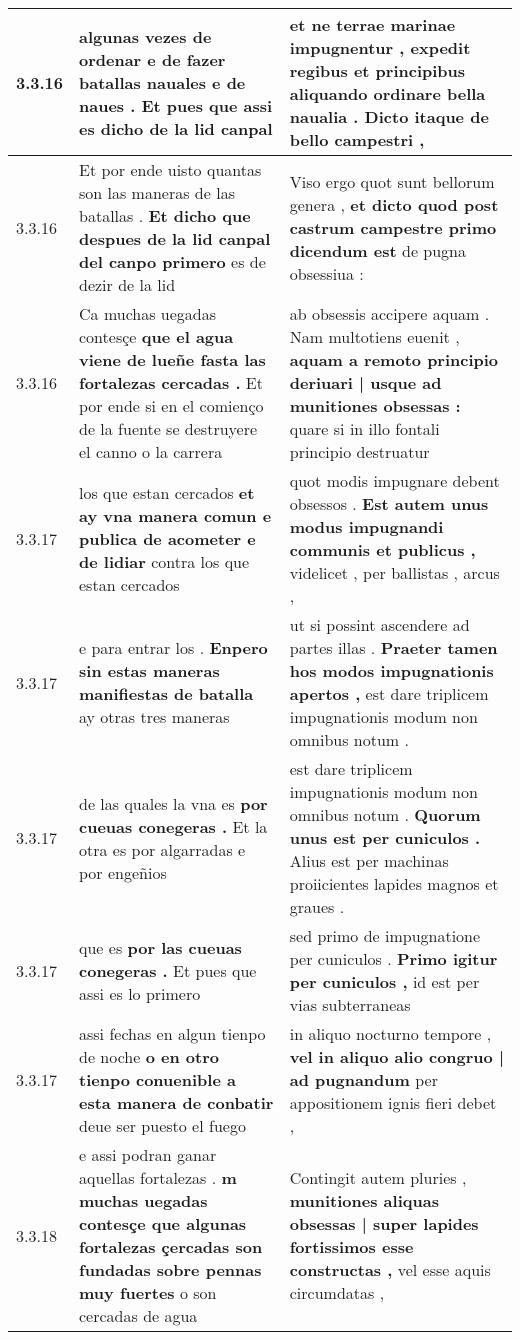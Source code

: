 \begin{tabular}{|p{1cm}|p{6.5cm}|p{6.5cm}|}
3.3.16 & algunas vezes de ordenar \textbf{ e de fazer batallas nauales e de naues . } Et pues que assi es dicho de la lid canpal & et ne terrae marinae impugnentur , \textbf{ expedit regibus et principibus aliquando ordinare bella naualia . } Dicto itaque de bello campestri , \\\hline
3.3.16 & Et por ende uisto quantas son las maneras de las batallas . \textbf{ Et dicho que despues de la lid canpal del canpo primero } es de dezir de la lid & Viso ergo quot sunt bellorum genera , \textbf{ et dicto quod post castrum campestre primo dicendum est } de pugna obsessiua : \\\hline
3.3.16 & Ca muchas uegadas contesçe \textbf{ que el agua viene de lueñe fasta las fortalezas cercadas . } Et por ende si en el comienço de la fuente se destruyere el canno o la carrera & ab obsessis accipere aquam . Nam multotiens euenit , \textbf{ aquam a remoto principio deriuari | usque ad munitiones obsessas : } quare si in illo fontali principio destruatur \\\hline
3.3.17 & los que estan cercados \textbf{ et ay vna manera comun e publica de acometer e de lidiar } contra los que estan cercados & quot modis impugnare debent obsessos . \textbf{ Est autem unus modus impugnandi communis et publicus , } videlicet , per ballistas , arcus , \\\hline
3.3.17 & e para entrar los . \textbf{ Enpero sin estas maneras manifiestas de batalla } ay otras tres maneras & ut si possint ascendere ad partes illas . \textbf{ Praeter tamen hos modos impugnationis apertos , } est dare triplicem impugnationis modum non omnibus notum . \\\hline
3.3.17 & de las quales la vna es \textbf{ por cueuas conegeras . } Et la otra es por algarradas e por engeñios & est dare triplicem impugnationis modum non omnibus notum . \textbf{ Quorum unus est per cuniculos . } Alius est per machinas proiicientes lapides magnos et graues . \\\hline
3.3.17 & que es \textbf{ por las cueuas conegeras . } Et pues que assi es lo primero & sed primo de impugnatione per cuniculos . \textbf{ Primo igitur per cuniculos , } id est per vias subterraneas \\\hline
3.3.17 & assi fechas en algun tienpo de noche \textbf{ o en otro tienpo conuenible a esta manera de conbatir } deue ser puesto el fuego & in aliquo nocturno tempore , \textbf{ vel in aliquo alio congruo | ad pugnandum } per appositionem ignis fieri debet , \\\hline
3.3.18 & e assi podran ganar aquellas fortalezas . \textbf{ m muchas uegadas contesçe que algunas fortalezas çercadas son fundadas sobre pennas muy fuertes } o son cercadas de agua & Contingit autem pluries , \textbf{ munitiones aliquas obsessas | super lapides fortissimos esse constructas , } vel esse aquis circumdatas , \\\hline

\end{tabular}
